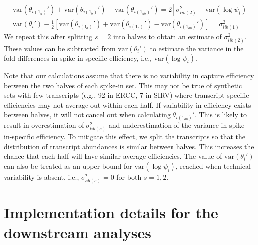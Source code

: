 \documentclass{article}
\begin{document}
\begin{align*}
    &\mbox{var}(\theta_{i(1_a)}') +  \mbox{var}(\theta_{i(1_b)}') - \mbox{var}(\theta_{i(1_{ab})}') = 2 [\sigma^2_{lib(2)} + \mbox{var}(\log \psi_i)] \\
    &\mbox{var}(\theta_i') - \textstyle\frac{1}{2}[\mbox{var}(\theta_{i(1_a)}') + \mbox{var}(\theta_{i(1_b)}') - \mbox{var}(\theta_{i(1_{ab})}') ] = \sigma^2_{lib(1)}
\end{align*}
We repeat this after splitting $s=2$ into halves to obtain an estimate of $\sigma^2_{lib(2)}$.
These values can be subtracted from $\mbox{var}(\theta_i')$ to estimate the variance in the fold-differences in spike-in-specific efficiency, i.e., $\mbox{var}(\log \psi_i)$.

Note that our calculations assume that there is no variability in capture efficiency between the two halves of each spike-in set.
This may not be true of synthetic sets with few transcripts (e.g., 92 in ERCC, 7 in SIRV) where transcript-specific efficiencies may not average out within each half.
If variability in efficiency exists between halves, it will not cancel out when calculating $\theta_{i(1_{ab})}'$.
This is likely to result in overestimation of $\sigma^2_{lib(s)}$ and underestimation of the variance in spike-in-specific efficiency.
To mitigate this effect, we split the transcripts so that the distribution of transcript abundances is similar between halves.
This increases the chance that each half will have similar average efficiencies.
The value of $\mbox{var}(\theta_i')$ can also be treated as an upper bound for $\mbox{var}(\log \psi_i)$, reached when technical variability is absent, i.e., $\sigma^2_{lib(s)}=0$ for both $s=1,2$.


\section{Implementation details for the downstream analyses}
\end{document}
